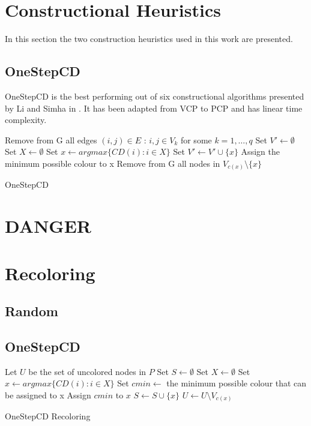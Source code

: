 \clearpage

\section{Constructional Heuristics}
\label{sec:construction}

In this section the two construction heuristics used in this work are presented. 

\subsection{OneStepCD}

OneStepCD is the best performing out of six constructional algorithms presented by Li and Simha in \cite{li-00}. It has been adapted from VCP to PCP and has linear time complexity.

\begin{algorithm}[h]
Remove from G all edges $(i,j) \in E$ : $i,j \in V_k$ for some $k=1,\ldots,q$\; 
Set $V' \gets \emptyset $\;
 {
  Set $X \gets \emptyset $\;
  Set $x \gets argmax\{CD(i) : i \in X \}$\;
  Set $V' \gets V' \cup \{x\}$\;
  Assign the minimum possible colour to x\;
  Remove from G all nodes in $V_{c(x)} \setminus \{x\} $\;
}
\;
\caption{OneStepCD}
\label{algo:osdc}
\end{algorithm}

\section{DANGER}


\section{Recoloring}
\label{sec:recoloring}


\subsection{Random}


\subsection{OneStepCD}

\begin{algorithm}[h]
Let $U$ be the set of uncolored nodes in $P$\;
Set $S \gets \emptyset$\;
 {
  Set $X \gets \emptyset $\;
  Set $x \gets argmax\{CD(i) : i \in X \}$\;
  Set $cmin \gets$ the minimum possible colour that can be assigned to x\;
  Assign $cmin$ to $x$\;
  $S \gets S \cup \{x\}$\;
  $U \gets U \setminus V_{c(x)}$\;
}
\;
\caption{OneStepCD Recoloring}
\label{algo:osdc2}
\end{algorithm}

